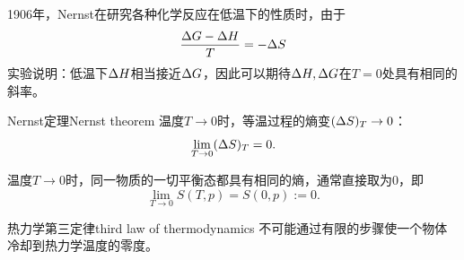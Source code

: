 1906年，Nernst在研究各种化学反应在低温下的性质时，由于
\[
	\frac{\Delta G-\Delta H}T=-\Delta S
\]
实验说明：低温下$\Delta H$相当接近$\Delta G$，因此可以期待$\Delta H,\Delta G$在$T=0$处具有相同的斜率。

\begin{theorem}
	{Nernst定理}{Nernst theorem}
	温度$T\to 0$时，等温过程的熵变$(\Delta S)_T\to 0$：
	\begin{equation}
		\lim_{T\to 0}(\Delta S)_T=0.
	\end{equation}
\end{theorem}

\begin{corollary}
	温度$T\to 0$时，同一物质的一切平衡态都具有相同的熵，通常直接取为0，即
	\begin{equation}
		\lim_{T\to 0}S(T,p)=S(0,p):=0.
	\end{equation}
\end{corollary}

\begin{theorem}
	{热力学第三定律}{third law of thermodynamics}
	不可能通过有限的步骤使一个物体冷却到热力学温度的零度。
\end{theorem}

